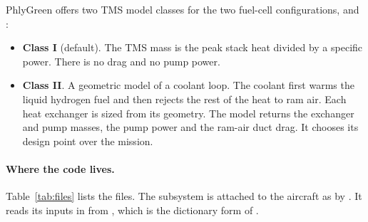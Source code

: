 \documentclass[a4paper,11pt]{article}
\begin{document}
PhlyGreen offers two TMS model classes for the two fuel-cell configurations,
 and :
\begin{itemize}
\item \textbf{Class I} (default). The TMS mass is the peak stack heat divided by a specific
  power. There is no drag and no pump power.
\item \textbf{Class II}. A geometric model of a coolant loop. The coolant first warms the
  liquid hydrogen fuel and then rejects the rest of the heat to ram air. Each heat exchanger
  is sized from its geometry. The model returns the exchanger and pump masses, the pump
  power and the ram-air duct drag. It chooses its design point over the mission.
\end{itemize}

\paragraph{Where the code lives.} Table~\ref{tab:files} lists the files. The subsystem is
attached to the aircraft as  by .
It reads its inputs in  from
, which is the dictionary form of .
\end{document}
